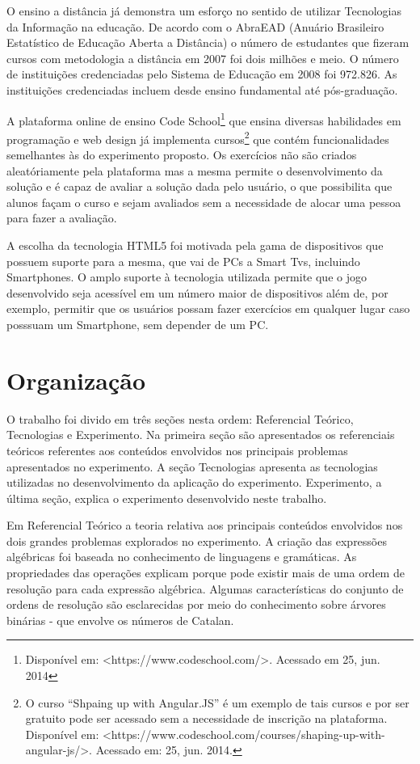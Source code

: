 	O ensino a distância já demonstra um esforço no sentido de utilizar Tecnologias da Informação na educação. De acordo com o AbraEAD (Anuário Brasileiro Estatístico de Educação Aberta a Distância) o número de estudantes que fizeram cursos com metodologia a distância em 2007 foi dois milhões e meio. O número de instituições credenciadas pelo Sistema de Educação em 2008 foi 972.826. As instituições credenciadas incluem desde ensino fundamental até pós-graduação. \cite{eadBr}

	A plataforma online de ensino Code School\footnote{Disponível em: <https://www.codeschool.com/>. Acessado em 25, jun. 2014} que ensina diversas habilidades em programação e web design já implementa cursos\footnote{O curso “Shpaing up with Angular.JS” é um exemplo de tais cursos e por ser gratuito pode ser acessado sem a necessidade de inscrição na plataforma. Disponível em: <https://www.codeschool.com/courses/shaping-up-with-angular-js/>. Acessado em: 25, jun. 2014.} que contém funcionalidades semelhantes às do experimento proposto. Os exercícios não são criados aleatóriamente pela plataforma mas a mesma permite o desenvolvimento da solução e é capaz de avaliar a solução dada pelo usuário, o que possibilita que alunos façam o curso e sejam avaliados sem a necessidade de alocar uma pessoa para fazer a avaliação.
	
	A escolha da tecnologia HTML5 foi motivada pela gama de dispositivos que possuem suporte para a mesma, que vai de PCs a Smart Tvs, incluindo Smartphones. O amplo suporte à tecnologia utilizada permite que o jogo desenvolvido seja acessível em um número maior de dispositivos além de, por exemplo, permitir que os usuários possam fazer exercícios em qualquer lugar caso posssuam um Smartphone, sem depender de um PC.
	
\section{Organização}
O trabalho foi divido em três seções nesta ordem: Referencial Teórico, Tecnologias e Experimento. Na primeira seção são apresentados os referenciais teóricos referentes aos conteúdos envolvidos nos principais problemas apresentados no experimento. A seção Tecnologias apresenta as tecnologias utilizadas no desenvolvimento da aplicação do experimento. Experimento, a última seção, explica o experimento desenvolvido neste trabalho. 

Em Referencial Teórico a teoria relativa aos principais conteúdos envolvidos nos dois grandes problemas explorados no experimento. A criação das expressões algébricas foi baseada no conhecimento de linguagens e gramáticas. As propriedades das operações explicam porque pode existir mais de uma ordem de resolução para cada expressão algébrica. Algumas características do conjunto de ordens de resolução são esclarecidas por meio do conhecimento sobre árvores binárias - que envolve os números de Catalan.

